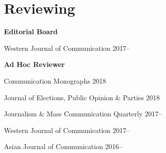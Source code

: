 \section{Reviewing}

  \textbf{Editorial Board}
    \begin{innerlist}
      \item Western Journal of Communication \hfill 2017--
    \end{innerlist}\vspace{1em}

  \textbf{Ad Hoc Reviewer}
    \begin{innerlist}
      \item Communication Monographs \hfill 2018
      \item Journal of Elections, Public Opinion \& Parties \hfill 2018
      \item Journalism \& Mass Communication Quarterly \hfill 2017--
      \item Western Journal of Communication \hfill 2017--
      \item Asian Journal of Communication \hfill 2016--
    \end{innerlist}\vspace{-.075in}
